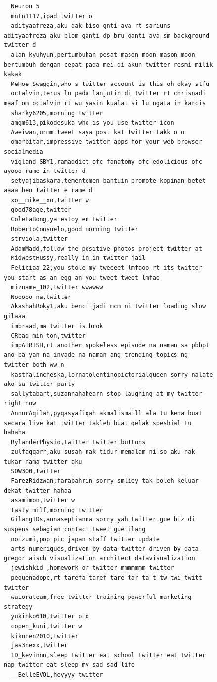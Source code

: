 \begin{figure}[htpb]
\begin{verbatim}
  Neuron 5
  mntn1117,ipad twitter o
  adityaafreza,aku dak biso gnti ava rt sariuns adityaafreza aku blom ganti dp bru ganti ava sm background twitter d
  alan_kyuhyun,pertumbuhan pesat mason moon mason moon bertumbuh dengan cepat pada mei di akun twitter resmi milik kakak
  MeHoe_Swaggin,who s twitter account is this oh okay stfu
  octalvin,terus lu pada lanjutin di twitter rt chrisnadi maaf om octalvin rt wu yasin kualat si lu ngata in karcis
  sharky6205,morning twitter
  amgm613,pikodesuka who is you use twitter icon
  Aweiwan,urmm tweet saya post kat twitter takk o o
  omarbitar,impressive twitter apps for your web browser socialmedia
  vigland_SBY1,ramaddict ofc fanatomy ofc edolicious ofc ayooo rame in twitter d
  setyajibaskara,tementemen bantuin promote kopinan betet aaaa ben twitter e rame d
  xo__mike__xo,twitter w
  good78age,twitter
  ColetaBong,ya estoy en twitter
  RobertoConsuelo,good morning twitter
  strviola,twitter
  AdamMadd,follow the positive photos project twitter at
  MidwestHussy,really im in twitter jail
  Feliciaa_22,you stole my tweeeet lmfaoo rt its twitter you start as an egg an you tweet tweet lmfao
  mizuame_102,twitter wwwwww
  Nooooo_na,twitter
  AkashahRoky1,aku benci jadi mcm ni twitter loading slow gilaaa
  imbraad,ma twitter is brok
  CRbad_min_ton,twitter
  impAIRISH,rt another spokeless episode na naman sa pbbpt ano ba yan na invade na naman ang trending topics ng twitter both ww n
  kasthalincheska,lornatolentinopictorialqueen sorry nalate ako sa twitter party
  sallytabart,suzannahahearn stop laughing at my twitter right now
  AnnurAqilah,pyqasyafiqah akmalismaill ala tu kena buat secara live kat twitter takleh buat gelak speshial tu hahaha
  RylanderPhysio,twitter twitter buttons
  zulfaqqarr,aku susah nak tidur memalam ni so aku nak tukar nama twitter aku
  SOW300,twitter
  FarezRidzwan,farabahrin sorry smliey tak boleh keluar dekat twitter hahaa
  asamimon,twitter w
  tasty_milf,morning twitter
  GilangTDs,annaseptianna sorry yah twitter gue biz di suspens sebagian contact tweet gue ilang
  noizumi,pop pic japan staff twitter update
  arts_numeriques,driven by data twitter driven by data gregor aisch visualization architect datavisualization
  jewishkid_,homework or twitter mmmmmmm twitter
  pequenadopc,rt tarefa taref tare tar ta t tw twi twitt twitter
  waiorateam,free twitter training powerful marketing strategy
  yukinko610,twitter o o
  copen_kuni,twitter w
  kikunen2010,twitter
  jas3nexx,twitter
  1D_kevinnn,sleep twitter eat school twitter eat twitter nap twitter eat sleep my sad sad life
  __BelleEVOL,heyyyy twitter

\end{verbatim}
\end{figure}
